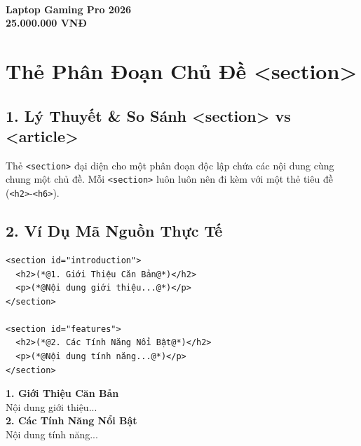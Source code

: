 \documentclass[11pt,oneside]{book}
\newcommand{\codeinline}[1]{\textcolor{accentOrange}{\texttt{#1}}}
\begin{document}
\begin{browserWindow}
\sffamily\small
\begin{tcolorbox}[colback=white, colframe=gray!30, width=0.65\linewidth, arc=6pt, drop shadow=black!5!white]
\centering
{} \\[4pt]
{\bfseries Laptop Gaming Pro 2026}\\[2pt]
\textcolor{accentOrange}{\bfseries 25.000.000 VNĐ}\\[4pt]
\end{tcolorbox}
\end{browserWindow}

\section{Thẻ Phân Đoạn Chủ Đề <section>}
\subsection{1. Lý Thuyết \& So Sánh <section> vs <article>}
Thẻ \codeinline{<section>} đại diện cho một phân đoạn độc lập chứa các nội dung cùng chung một chủ đề. Mỗi \codeinline{<section>} luôn luôn nên đi kèm với một thẻ tiêu đề (\codeinline{<h2>}-\codeinline{<h6>}).

\subsection{2. Ví Dụ Mã Nguồn Thực Tế}
\begin{codeWindow}
\begin{lstlisting}[language=HTML5]
<section id="introduction">
  <h2>(*@1. Giới Thiệu Căn Bản@*)</h2>
  <p>(*@Nội dung giới thiệu...@*)</p>
</section>

<section id="features">
  <h2>(*@2. Các Tính Năng Nổi Bật@*)</h2>
  <p>(*@Nội dung tính năng...@*)</p>
</section>
\end{lstlisting}
\end{codeWindow}

\begin{browserWindow}
\sffamily\small
{\bfseries\large 1. Giới Thiệu Căn Bản}\\[2pt]
Nội dung giới thiệu...\\[6pt]
{\bfseries\large 2. Các Tính Năng Nổi Bật}\\[2pt]
Nội dung tính năng...
\end{browserWindow}
\end{document}
